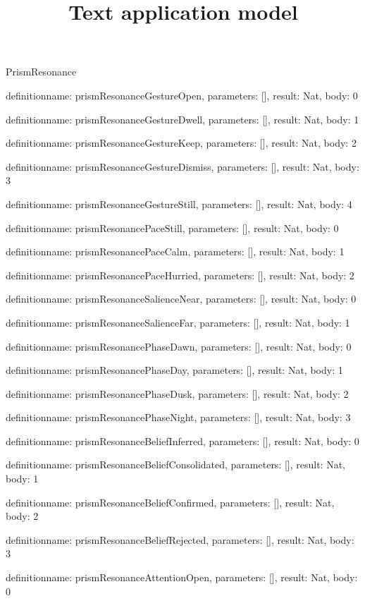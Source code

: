 \begin{lexlean}{PrismResonance}
\title{Text application model}
\begin{semanticmodule}
definition{name: prismResonanceGestureOpen, parameters: [], result: Nat, body: 0}

definition{name: prismResonanceGestureDwell, parameters: [], result: Nat, body: 1}

definition{name: prismResonanceGestureKeep, parameters: [], result: Nat, body: 2}

definition{name: prismResonanceGestureDismiss, parameters: [], result: Nat, body: 3}

definition{name: prismResonanceGestureStill, parameters: [], result: Nat, body: 4}

definition{name: prismResonancePaceStill, parameters: [], result: Nat, body: 0}

definition{name: prismResonancePaceCalm, parameters: [], result: Nat, body: 1}

definition{name: prismResonancePaceHurried, parameters: [], result: Nat, body: 2}

definition{name: prismResonanceSalienceNear, parameters: [], result: Nat, body: 0}

definition{name: prismResonanceSalienceFar, parameters: [], result: Nat, body: 1}

definition{name: prismResonancePhaseDawn, parameters: [], result: Nat, body: 0}

definition{name: prismResonancePhaseDay, parameters: [], result: Nat, body: 1}

definition{name: prismResonancePhaseDusk, parameters: [], result: Nat, body: 2}

definition{name: prismResonancePhaseNight, parameters: [], result: Nat, body: 3}

definition{name: prismResonanceBeliefInferred, parameters: [], result: Nat, body: 0}

definition{name: prismResonanceBeliefConsolidated, parameters: [], result: Nat, body: 1}

definition{name: prismResonanceBeliefConfirmed, parameters: [], result: Nat, body: 2}

definition{name: prismResonanceBeliefRejected, parameters: [], result: Nat, body: 3}

definition{name: prismResonanceAttentionOpen, parameters: [], result: Nat, body: 0}


\end{semanticmodule}
\end{lexlean}
